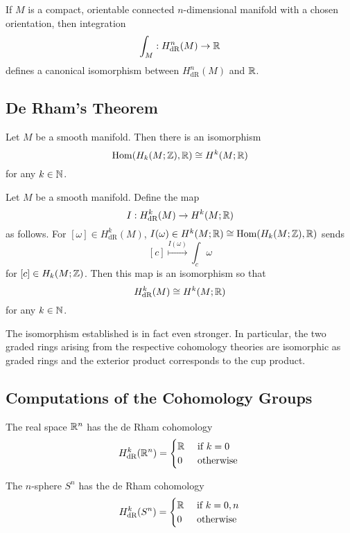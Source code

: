 \documentclass[a4paper]{article}
\begin{document}
\begin{thm}{}{} If $M$ is a compact, orientable connected $n$-dimensional manifold with a chosen orientation, then integration $$\int_M:H_\text{dR}^n(M)\to\mathbb{R}$$ defines a canonical isomorphism between $H_\text{dR}^n(M)$ and $\mathbb{R}$. 
\end{thm}

\subsection{De Rham's Theorem}
\begin{prp}{}{} Let $M$ be a smooth manifold. Then there is an isomorphism $$\operatorname{Hom}(H_k(M;\mathbb{Z}),\mathbb{R})\cong H^k(M;\mathbb{R})$$ for any $k\in\mathbb{N}$. 
\end{prp}

\begin{thm}{}{} Let $M$ be a smooth manifold. Define the map $$I:H_{\text{dR}}^k(M)\to H^k(M;\mathbb{R})$$ as follows. For $[\omega]\in H_{\text{dR}}^k(M)$, $I(\omega)\in H^k(M;\mathbb{R})\cong\operatorname{Hom}(H_k(M;\mathbb{Z}),\mathbb{R})$ sends $$[c]\overset{I(\omega)}{\mapsto}\int_c\omega$$ for $[c]\in H_k(M;\mathbb{Z})$. Then this map is an isomorphism so that $$H_{\text{dR}}^k(M)\cong H^k(M;\mathbb{R})$$ for any $k\in\mathbb{N}$. 
\end{thm}

The isomorphism established is in fact even stronger. In particular, the two graded rings arising from the respective cohomology theories are isomorphic as graded rings and the exterior product corresponds to the cup product. 

\subsection{Computations of the Cohomology Groups}
\begin{prp}{}{} The real space $\mathbb{R}^n$ has the de Rham cohomology $$H_{\text{dR}}^k(\mathbb{R}^n)=\begin{cases}
\mathbb{R} & \text{ if }k=0\\
0 & \text{ otherwise }
\end{cases}$$
\end{prp}

\begin{prp}{}{} The $n$-sphere $S^n$ has the de Rham cohomology $$H_{\text{dR}}^k(S^n)=\begin{cases}
\mathbb{R} & \text{ if }k=0,n\\
0 & \text{ otherwise }
\end{cases}$$
\end{prp}
\end{document}
